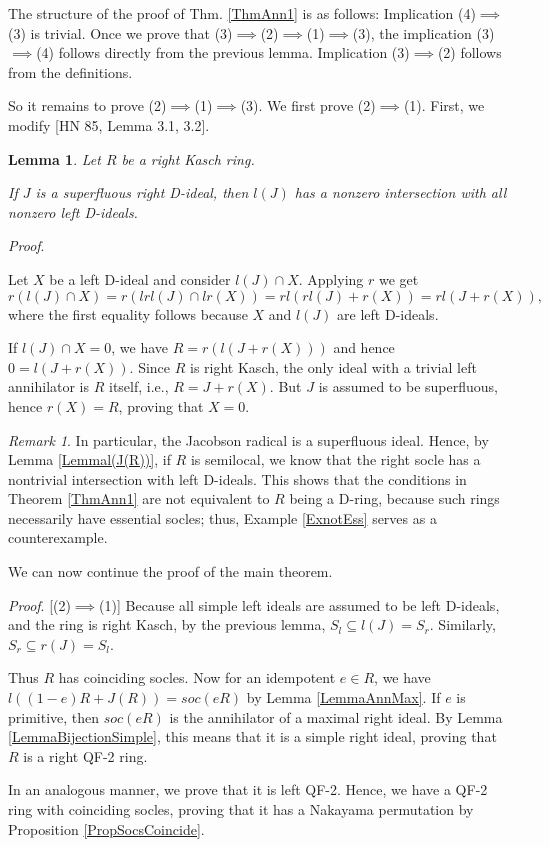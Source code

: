 \documentclass[11pt]{article}
\theoremstyle{plain}
\newtheorem{Lemma}[veta]{Lemma}
\theoremstyle{remark}
\newtheorem*{remark}{Remark}
\theoremstyle{plain}
\newenvironment{Proof}{
  \par\medskip\noindent
  \textit{Proof}.
}{
\newline
\rightline{$\qedsymbol$}
}
\begin{document}
\smallskip

The structure of the proof of Thm. \ref{ThmAnn1} is as follows: Implication (4)$\implies$(3) is trivial. Once we prove that (3)$\implies$(2)$\implies$(1)$\implies$(3), the implication (3)$\implies$(4) follows directly from the previous lemma. Implication (3)$\implies$(2)  follows from the definitions. 

So it remains to prove (2)$\implies$(1)$\implies$(3).  We first prove (2)$\implies$(1). First, we modify  [HN 85, Lemma 3.1,  3.2].
\begin{Lemma}
Let $R$ be a right Kasch ring. 

If $J$ is a superfluous right D-ideal, then $l(J)$ has a nonzero intersection with all nonzero left D-ideals. 
\end{Lemma}
\begin{Proof}
    Let $X$ be a left D-ideal and consider $l(J)\cap X$. Applying $r$ we get
    \[r(l(J)\cap X)=r(lrl(J)\cap lr(X))=rl(rl(J)+r(X))=rl(J+r(X)),\]
where the first equality follows because $X$ and $l(J)$ are left D-ideals. 

If $l(J)\cap X=0$, we have $R=r(l(J+r(X)))$ and hence $0=l(J+r(X))$. Since $R$ is right Kasch, the only ideal with a trivial left annihilator is $R$ itself, i.e., $R=J+r(X)$. But $J$ is assumed to be superfluous, hence $r(X)=R$, proving that $X=0$.
\end{Proof}
\begin{remark}
    In particular, the Jacobson radical is a superfluous ideal. Hence, by Lemma \ref{Lemmal(J(R))}, if $R$ is semilocal, we know that the right socle has a nontrivial intersection with left D-ideals. This shows that the conditions in Theorem \ref{ThmAnn1} are not equivalent to $R$ being a D-ring, because such rings necessarily have essential socles; thus, Example \ref{ExnotEss} serves as a counterexample.
\end{remark}

We can now continue the proof of the main theorem. 
\begin{Proof}[(2)$\implies$(1)]
Because all simple left ideals are assumed to be left D-ideals, and the ring is right Kasch, by the previous lemma, $S_l\subseteq l(J)=S_r$. Similarly, $S_r\subseteq r(J)=S_l$.

Thus $R$ has coinciding socles. Now for an idempotent $e\in R$, we have $l((1-e)R+J(R))=soc(eR)$ by Lemma \ref{LemmaAnnMax}. If $e$ is primitive, then $soc(eR)$ is the annihilator of a maximal right ideal. By Lemma \ref{LemmaBijectionSimple}, this means that it is a simple right ideal, proving that $R$ is a right QF-2 ring. 

    In an analogous manner, we prove that it is left QF-2. Hence, we have a QF-2 ring with coinciding socles, proving that it has a Nakayama permutation by Proposition \ref{PropSocsCoincide}.
\end{Proof}
\end{document}
